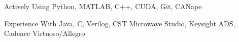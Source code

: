 
\begin{cvskills}

    \cvskill
        {Actively Using}
        {Python, MATLAB, C++, CUDA, Git, CANape}

    \cvskill
        {Experience With}
        {Java, C, Verilog, CST Microwave Studio, Keysight ADS, Cadence Virtuoso/Allegro}

\end{cvskills}
